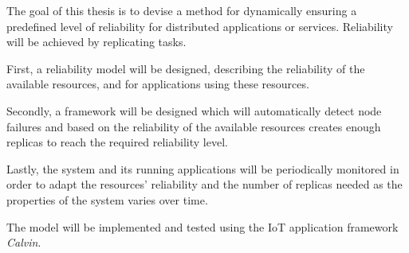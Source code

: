 \documentclass{cslthse-msc}
\begin{document}
The goal of this thesis is to devise a method for dynamically ensuring a predefined level of reliability for distributed applications or services. Reliability will be achieved by replicating tasks. 

First, a reliability model will be designed, describing the reliability of the available resources, and for applications using these resources.

Secondly, a framework will be designed which will automatically detect node failures and based on the reliability of the available resources creates enough replicas to reach the required reliability level.

Lastly, the system and its running applications will be periodically monitored in order to adapt the resources' reliability and the number of replicas needed as the properties of the system varies over time.

The model will be implemented and tested using the IoT application framework \emph{Calvin}.
\fi
\end{document}
